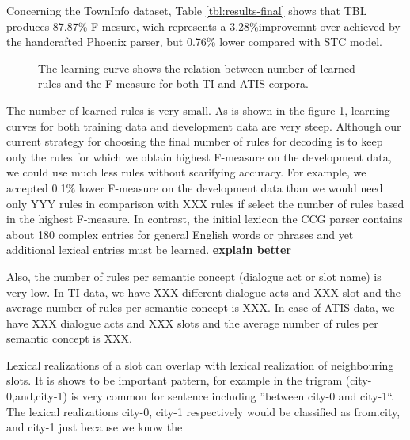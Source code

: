 \documentclass{article}
\newcommand{\efgr}[2]{
  \begin{figure}[htbp]
    \makebox[8.5cm]{\framebox[5cm]{\rule{0pt}{5cm}}}
    \caption{#2}
    \label{#1}
  \end{figure}
}
\begin{document}
Concerning the TownInfo dataset, Table \ref{tbl:results-final} shows that TBL produces 87.87\% F-mesure, wich represents a 3.28\%improvemnt over achieved by the handcrafted Phoenix parser, but 0.76\% lower compared with STC model.


\efgr{fig:learning:curve}{The learning curve shows the relation between number of learned rules and the F-measure for both TI and ATIS corpora.}

The number of learned rules is very small. As is shown in the figure \ref{fig:learning:curve}, learning curves for both training data and development data are very steep. Although our current strategy for choosing the final number of rules for decoding is to keep only the rules for which we obtain highest F-measure on the development data, we could use much less rules without scarifying accuracy. For example, we accepted 0.1\% lower F-measure on the development data than we would need only YYY rules in comparison with XXX rules if select the number of rules based in the highest F-measure. In contrast, the initial lexicon the CCG parser \cite{zettlemoyer07} contains about 180 complex entries for general English words or phrases and yet additional lexical entries must be learned. \textbf{explain better}

Also, the number of rules per semantic concept (dialogue act or slot name) is very low. In TI data, we have XXX different dialogue acts and XXX slot and the average number of rules per semantic concept is XXX. In case of ATIS data, we have XXX dialogue acts and XXX slots and the average number of rules per semantic concept is XXX.

Lexical realizations of a slot can overlap with lexical realization of neighbouring slots. It is shows to be important pattern, for example in the trigram (city-0,and,city-1) is very common for sentence including ''between city-0 and city-1``. The lexical realizations city-0, city-1 respectively would be classified as from.city, and city-1 just because we know the  
\end{document}
